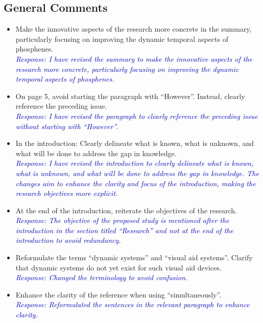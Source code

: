 \documentclass[10pt]{article}
\begin{document}
\subsection*{General Comments}
\begin{itemize}
  \item Make the innovative aspects of the research more concrete in the summary, particularly focusing on improving the dynamic temporal aspects of phosphenes.\\
        \textcolor{blue}{\textit{Response: I have revised the summary to make the innovative aspects of the research more concrete, particularly focusing on improving the dynamic temporal aspects of phosphenes.}}

  \item On page 5, avoid starting the paragraph with ``However''. Instead, clearly reference the preceding issue.\\
        \textcolor{blue}{\textit{Response: I have revised the paragraph to clearly reference the preceding issue without starting with ``However''.}}

  \item In the introduction: Clearly delineate what is known, what is unknown, and what will be done to address the gap in knowledge.\\
        \textcolor{blue}{\textit{Response:  I have revised the introduction to clearly delineate what is known, what is unknown, and what will be done to address the gap in knowledge. The changes aim to enhance the clarity and focus of the introduction, making the research objectives more explicit.}}

  \item At the end of the introduction, reiterate the objectives of the research.\\
        \textcolor{blue}{\textit{Response: The objective of the proposed study
            is mentioned after the introduction in the section titled ``Research''
            and not at the end of the introduction to avoid redundancy.}}

  \item Reformulate the terms ``dynamic systems'' and ``visual aid systems''. Clarify that dynamic systems do not yet exist for such visual aid devices.\\
        \textcolor{blue}{\textit{Response: Changed the terminology to avoid confusion.}}

  \item Enhance the clarity of the reference when using ``simultaneously''.\\
        \textcolor{blue}{\textit{Response: Reformulated the sentences in the
            relevant paragraph to enhance clarity.}}


\end{itemize}
\end{document}
